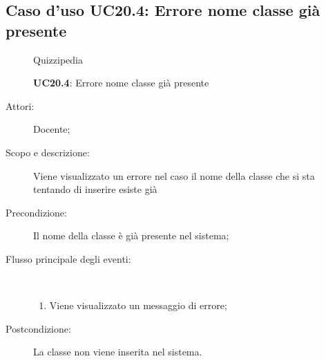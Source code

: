 \subsection{Caso d'uso UC20.4: Errore nome classe già presente}
	\begin{figure}[H]
		\centering
		\begin{resizedtikzpicture}{\textwidth}
		\begin{umlsystem}[x=0, fill=lightgray!20]{Quizzipedia}
		\end{umlsystem}
		\end{resizedtikzpicture}
		\caption{\textbf{UC20.4}: Errore nome classe già presente}
		\label{UC20.4}
	\end{figure}
\begin{description}
\item[Attori:] Docente;
\item[Scopo e descrizione:] Viene visualizzato un errore nel caso il nome della classe che si sta tentando di inserire esiste già
      \item[Precondizione:] Il nome della classe è già presente nel sistema;

        \item[Flusso principale degli eventi:] \ 
 \begin{enumerate}
          \item Viene visualizzato un messaggio di errore;

      \end{enumerate}
    \item[Postcondizione:] La classe non viene inserita nel sistema.
  \end{description}
\hypertarget{UC21}{}
